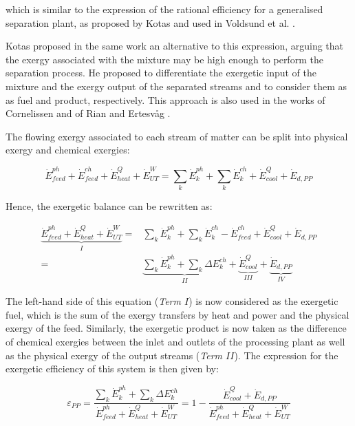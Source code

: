 \documentclass[times,3p]{elsarticle}
\begin{document}
	which is similar to the expression of the rational efficiency for a generalised separation plant, as proposed by Kotas \cite{Kotas1995} and used in Voldsund et al. \cite{Voldsund2010,Voldsund2012}. 
	
	Kotas \cite{Kotas1995} proposed in the same work an alternative to this expression, arguing that the exergy associated with the mixture may be high enough to perform the separation process. He proposed to differentiate the exergetic input of the mixture and the exergy output of the separated streams and to consider them as as fuel and product, respectively. This approach is also used in the works of Cornelissen \cite{Cornelissen1997} and of Rian and Ertesv\aa g \cite{Rian2012}. 

The flowing exergy associated to each stream of matter can be split into physical exergy and chemical exergies:

\begin{equation}
	\dot{E}^{ph}_{feed}+\dot{E}^{ch}_{feed}+\dot{E}^{Q}_{heat}+\dot{E}^{W}_{UT}=\sum_k\dot{E}^{ph}_k+\sum_k\dot{E}^{ch}_k+\dot{E}^{Q}_{cool}+\dot{E}_{d,PP}
\end{equation}

Hence, the exergetic balance can be rewritten as:

\begin{align}
	\underbrace{\dot{E}^{ph}_{feed}+\dot{E}^{Q}_{heat}+\dot{E}^{W}_{UT}}_{I}=&\sum_k\dot{E}^{ph}_k+\sum_k\dot{E}^{ch}_k-\dot{E}^{ch}_{feed}+\dot{E}^{Q}_{cool}+\dot{E}_{d,PP} \nonumber \\
																						  =&\underbrace{\sum_k\dot{E}^{ph}_k+\sum_k\Delta E^{ch}_k}_{II}+\underbrace{\dot{E}^{Q}_{cool}}_{III}+\underbrace{\dot{E}_{d,PP}}_{IV}	
\end{align}

The left-hand side of this equation (\emph{Term $I$}) is now considered as the exergetic fuel, which is the sum of the exergy transfers by heat and power and the physical exergy of the feed. Similarly, the exergetic product is now taken as the difference of chemical exergies between the inlet and outlets of the processing plant as well as the physical exergy of the output streams (\emph{Term $II$}). The expression for the exergetic efficiency of this system is then given by:

\begin{equation}
	\varepsilon_{PP} =\frac{\sum_k\dot{E}^{ph}_k+\sum_k\Delta E^{ch}_k}{\dot{E}^{ph}_{feed}+\dot{E}^{Q}_{heat}+\dot{E}^{W}_{UT}}=1-\frac{\dot{E}^{Q}_{cool}+\dot{E}_{d,PP}}{\dot{E}^{ph}_{feed}+\dot{E}^{Q}_{heat}+\dot{E}^{W}_{UT}}
\end{equation}
\end{document}
